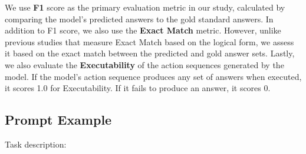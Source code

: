 We use \textbf{F1} score as the primary evaluation metric in our study, calculated by comparing the model's predicted answers to the gold standard answers.
In addition to F1 score, we also use the \textbf{Exact Match} metric. However, unlike previous studies that measure Exact Match based on the logical form, we assess it based on the exact match between the predicted and gold answer sets.
Lastly, we also evaluate the \textbf{Executability} of the action sequences generated by the model. If the model's action sequence produces any set of answers when executed, it scores 1.0 for Executability. If it fails to produce an answer, it scores 0. 

\subsection{Prompt Example}
Task description:

